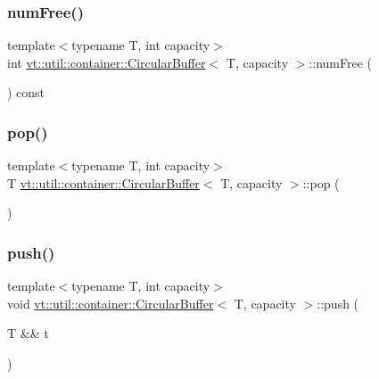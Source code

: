 \subsubsection{\texorpdfstring{num\+Free()}{numFree()}}
{\footnotesize\ttfamily template$<$typename T, int capacity$>$ \\
int \hyperlink{structvt_1_1util_1_1container_1_1_circular_buffer}{vt\+::util\+::container\+::\+Circular\+Buffer}$<$ T, capacity $>$\+::num\+Free (\begin{DoxyParamCaption}{ }\end{DoxyParamCaption}) const\hspace{0.3cm}{\ttfamily [inline]}}

\mbox{\label{structvt_1_1util_1_1container_1_1_circular_buffer_aa35da044d0a91356040a531776d4ae61}} 
\subsubsection{\texorpdfstring{pop()}{pop()}}
{\footnotesize\ttfamily template$<$typename T, int capacity$>$ \\
T \hyperlink{structvt_1_1util_1_1container_1_1_circular_buffer}{vt\+::util\+::container\+::\+Circular\+Buffer}$<$ T, capacity $>$\+::pop (\begin{DoxyParamCaption}{ }\end{DoxyParamCaption})\hspace{0.3cm}{\ttfamily [inline]}}

\mbox{\label{structvt_1_1util_1_1container_1_1_circular_buffer_a3abb7bc0fe6fc2989e042a817822d56a}} 
\subsubsection{\texorpdfstring{push()}{push()}\hspace{0.1cm}{\footnotesize\ttfamily [1/2]}}
{\footnotesize\ttfamily template$<$typename T, int capacity$>$ \\
void \hyperlink{structvt_1_1util_1_1container_1_1_circular_buffer}{vt\+::util\+::container\+::\+Circular\+Buffer}$<$ T, capacity $>$\+::push (\begin{DoxyParamCaption}\item[{T \&\&}]{t }\end{DoxyParamCaption})\hspace{0.3cm}{\ttfamily [inline]}}

